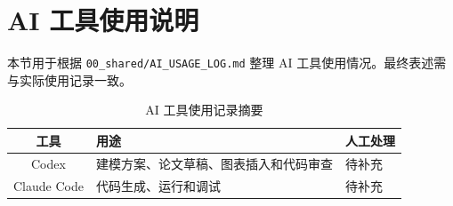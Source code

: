 \section{AI 工具使用说明}

本节用于根据 \texttt{00\_shared/AI\_USAGE\_LOG.md} 整理 AI 工具使用情况。最终表述需与实际使用记录一致。

\begin{table}[htbp]
  \centering
  \caption{AI 工具使用记录摘要}
  \begin{tabularx}{\textwidth}{cYY}
    \toprule
    工具 & 用途 & 人工处理 \\
    \midrule
    Codex & 建模方案、论文草稿、图表插入和代码审查 & 待补充 \\
    Claude Code & 代码生成、运行和调试 & 待补充 \\
    \bottomrule
  \end{tabularx}
\end{table}
